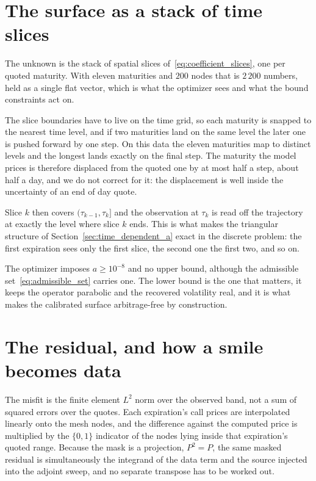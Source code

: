 \section{The surface as a stack of time slices}
\label{subsec:slice_parametrization}

The unknown is the stack of spatial slices of~\eqref{eq:coefficient_slices}, one per quoted
maturity. With eleven maturities and $200$ nodes that is $2\,200$ numbers, held as a single
flat vector, which is what the optimizer sees and what the bound constraints act on.

The slice boundaries have to live on the time grid, so each maturity is snapped to the nearest
time level, and if two maturities land on the same level the later one is pushed forward by
one step. On this data the eleven maturities map to distinct levels and the longest lands
exactly on the final step. The maturity the model prices is therefore displaced from the
quoted one by at most half a step, about half a day, and we do not correct for it: the
displacement is well inside the uncertainty of an end of day quote.

Slice $k$ then covers $(\tau_{k-1},\tau_k]$ and the observation at $\tau_k$ is read off the
trajectory at exactly the level where slice $k$ ends. This is what makes the triangular
structure of Section~\ref{sec:time_dependent_a} exact in the discrete problem: the first
expiration sees only the first slice, the second one the first two, and so on.

The optimizer imposes $a \ge 10^{-8}$ and no upper bound, although the admissible
set~\eqref{eq:admissible_set} carries one. The lower bound is the one that matters, it keeps
the operator parabolic and the recovered volatility real, and it is what makes the calibrated
surface arbitrage-free by construction.

\section{The residual, and how a smile becomes data}
\label{subsec:observation_operator}

The misfit is the finite element $L^2$ norm over the observed band, not a sum of squared
errors over the quotes. Each expiration's call prices are interpolated linearly onto the mesh
nodes, and the difference against the computed price is multiplied by the $\{0,1\}$ indicator
of the nodes lying inside that expiration's quoted range. Because the mask is a projection,
$P^2 = P$, the same masked residual is simultaneously the integrand of the data term and the
source injected into the adjoint sweep, and no separate transpose has to be worked out.

